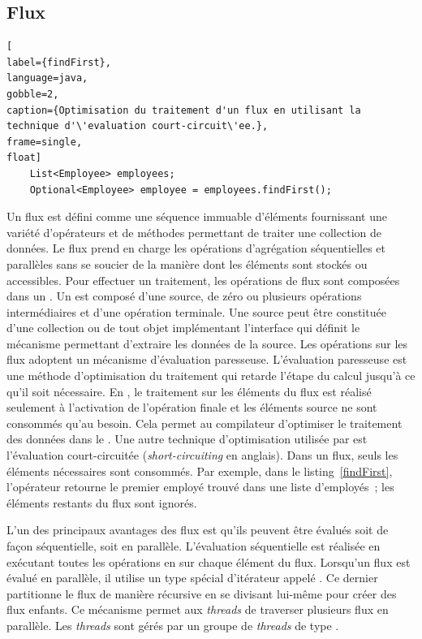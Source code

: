 \subsection{Flux}


\begin{lstlisting}[
label={findFirst},
language=java,
gobble=2,
caption={Optimisation du traitement d'un flux en utilisant la technique d'\'evaluation court-circuit\'ee.},
frame=single,
float]
	List<Employee> employees;
	Optional<Employee> employee = employees.findFirst();
\end{lstlisting}


Un flux est d\'efini comme une s\'equence immuable d'\'el\'ements fournissant une vari\'et\'e d'op\'erateurs et de m\'ethodes permettant de traiter une collection de donn\'ees. Le flux prend en charge les op\'erations d'agr\'egation \citep{javaStreamAggregate} s\'equentielles et parall\`eles sans se soucier de la mani\`ere dont les \'el\'ements sont stock\'es ou accessibles. Pour effectuer un traitement, les op\'erations de flux sont compos\'ees dans un . Un  est compos\'e d'une source, de z\'ero ou plusieurs op\'erations interm\'ediaires et d'une op\'eration terminale. Une source peut \^etre constitu\'ee d'une collection ou de tout objet impl\'ementant l'interface qui d\'efinit le m\'ecanisme permettant d'extraire les donn\'ees de la source. 
Les op\'erations sur les flux adoptent un m\'ecanisme d'\'evaluation paresseuse. L'\'evaluation paresseuse est une m\'ethode d'optimisation du traitement qui retarde l'\'etape du calcul jusqu'\`a ce qu'il soit nécessaire. En , le traitement sur les \'el\'ements du flux est r\'ealis\'e seulement \`a l'activation de l'op\'eration finale et les \'el\'ements source ne sont consomm\'es qu'au besoin. Cela permet au compilateur d'optimiser le traitement des donn\'ees dans le .
Une autre technique d'optimisation utilis\'ee par  est l'\'evaluation court-circuit\'ee (\emph{short-circuiting} en anglais). Dans un flux, seuls les \'el\'ements n\'ecessaires sont consomm\'es. Par exemple, dans le listing~\ref{findFirst}, l'opérateur  retourne le premier employ\'e trouv\'e dans une liste d'employ\'es~; les \'el\'ements restants du flux sont ignor\'es.


L'un des principaux avantages des flux est qu'ils peuvent \^etre \'evalu\'es soit de fa\c{c}on s\'equentielle, soit en parall\`ele. L'\'evaluation s\'equentielle est r\'ealis\'ee en ex\'ecutant toutes les op\'erations en  sur chaque \'el\'ement du flux. Lorsqu'un flux est \'evalu\'e en parall\`ele, il utilise un type sp\'ecial d'it\'erateur appel\'e . Ce dernier partitionne le flux de mani\`ere r\'ecursive en se divisant lui-m\^eme pour cr\'eer des flux enfants. Ce m\'ecanisme permet aux \emph{threads} de traverser plusieurs flux en parall\`ele. Les \emph{threads} sont g\'er\'es par un groupe de \emph{threads} de type .


